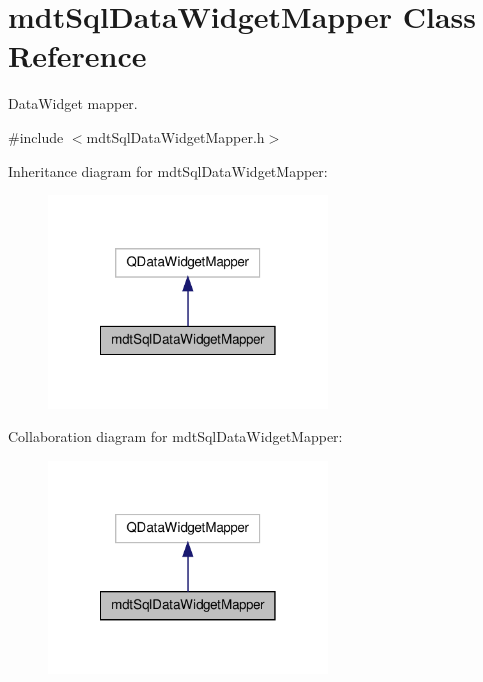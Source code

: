 \hypertarget{classmdt_sql_data_widget_mapper}{\section{mdt\-Sql\-Data\-Widget\-Mapper Class Reference}
\label{classmdt_sql_data_widget_mapper}
}


Data\-Widget mapper.  




{\ttfamily \#include $<$mdt\-Sql\-Data\-Widget\-Mapper.\-h$>$}



Inheritance diagram for mdt\-Sql\-Data\-Widget\-Mapper\-:\nopagebreak
\begin{figure}[H]
\begin{center}
\leavevmode
\includegraphics[width=210pt]{classmdt_sql_data_widget_mapper__inherit__graph}
\end{center}
\end{figure}


Collaboration diagram for mdt\-Sql\-Data\-Widget\-Mapper\-:\nopagebreak
\begin{figure}[H]
\begin{center}
\leavevmode
\includegraphics[width=210pt]{classmdt_sql_data_widget_mapper__coll__graph}
\end{center}
\end{figure}
